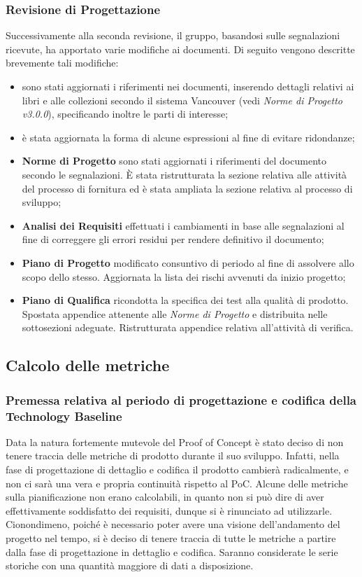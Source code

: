 \subsubsection{Revisione di Progettazione}
Successivamente alla seconda revisione, il gruppo, basandosi sulle 
segnalazioni ricevute, ha apportato varie modifiche ai documenti. 
Di seguito vengono descritte brevemente tali modifiche:
\begin{itemize}
	\item sono stati aggiornati i riferimenti nei documenti, inserendo dettagli relativi ai libri e alle collezioni secondo il sistema Vancouver (vedi \textit{Norme di Progetto v3.0.0}), specificando inoltre le parti di interesse;
	\item è stata aggiornata la forma di alcune espressioni al fine di evitare ridondanze;
	\item \textbf{Norme di Progetto} sono stati aggiornati i riferimenti del documento secondo le segnalazioni. \`E stata ristrutturata la sezione relativa alle attività del processo di fornitura ed è stata ampliata la sezione relativa al processo di sviluppo;
	\item \textbf{Analisi dei Requisiti} effettuati i cambiamenti in base alle segnalazioni al fine di correggere gli errori residui per rendere definitivo il documento;
	\item \textbf{Piano di Progetto} modificato consuntivo di periodo al fine di assolvere allo scopo dello stesso. Aggiornata la lista dei rischi avvenuti da inizio progetto;
	\item \textbf{Piano di Qualifica} ricondotta la specifica dei test alla qualità di prodotto. Spostata appendice attenente alle \textit{Norme di Progetto} e distribuita nelle sottosezioni adeguate. Ristrutturata appendice relativa all'attività di verifica.
\end{itemize}

\subsection{Calcolo delle metriche}
\subsubsection{Premessa relativa al periodo di progettazione e codifica della Technology Baseline}
Data la natura fortemente mutevole del Proof of Concept è stato deciso di non tenere traccia delle metriche di prodotto durante il suo sviluppo. Infatti, nella fase di progettazione di dettaglio e codifica il prodotto cambierà radicalmente, e non ci sarà una vera e propria continuità rispetto al PoC. \newline
Alcune delle metriche sulla pianificazione non erano calcolabili, in quanto non si può dire di aver effettivamente soddisfatto dei requisiti, dunque si è rinunciato ad utilizzarle.
Cionondimeno, poiché è necessario poter avere una visione dell'andamento del progetto nel tempo, si è deciso di tenere traccia di tutte le metriche a partire dalla fase di progettazione in dettaglio e codifica. Saranno considerate le serie storiche con una quantità maggiore di dati a disposizione.
